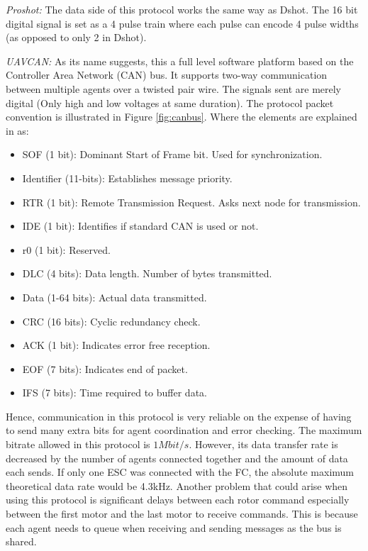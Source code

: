\textit{Proshot: } The data side of this protocol works the same way as Dshot. The 16 bit digital signal is set as a 4 pulse train where each pulse can encode 4 pulse widths (as opposed to only 2 in Dshot).
\newline

\textit{UAVCAN: } As its name suggests, this a full level software platform based on the Controller Area Network (CAN) bus. It supports two-way communication between multiple agents over a twisted pair wire. The signals sent are merely digital (Only high and low voltages at same duration). The protocol packet convention is illustrated in Figure \ref{fig:canbus}. Where the elements are explained in \cite{Corrigan2016} as:
\begin{itemize}
    \item SOF (1 bit): Dominant Start of Frame bit. Used for synchronization.
    \item Identifier (11-bits): Establishes message priority.
    \item RTR (1 bit): Remote Transmission Request. Asks next node for transmission.
    \item IDE (1 bit): Identifies if standard CAN is used or not.
    \item r0 (1 bit): Reserved.
    \item DLC (4 bits): Data length. Number of bytes transmitted.
    \item Data (1-64 bits): Actual data transmitted.
    \item CRC (16 bits): Cyclic redundancy check.
    \item ACK (1 bit): Indicates error free reception.
    \item EOF (7 bits): Indicates end of packet.
    \item IFS (7 bits): Time required to buffer data.
\end{itemize}

Hence, communication in this protocol is very reliable on the expense of having to send many extra bits for agent coordination and error checking. The maximum bitrate allowed in this protocol is $1Mbit/s$. However, its data transfer rate is decreased by the number of agents connected together and the amount of data each sends. If only one ESC was connected with the FC, the absolute maximum theoretical data rate would be 4.3kHz. Another problem that could arise when using this protocol is significant delays between each rotor command especially between the first motor and the last motor to receive commands. This is because each agent needs to queue when receiving and sending messages as the bus is shared.

